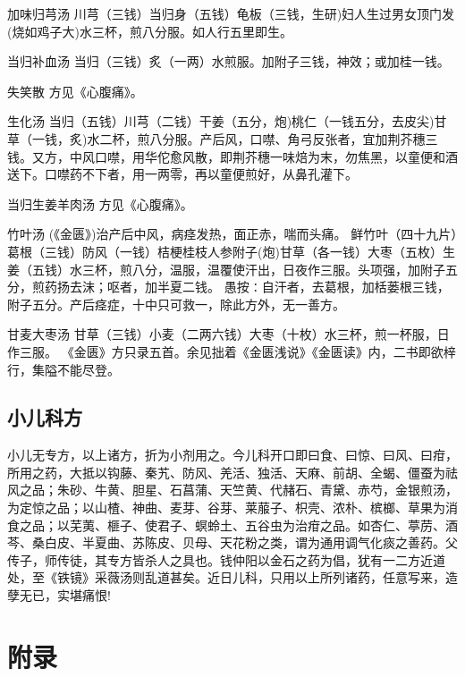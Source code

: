 \documentclass[a4paper,12pt,UTF8,twoside]{ctexbook}
\begin{document}
	加味归芎汤
	川芎（三钱）当归身（五钱）龟板（三钱，生研)妇人生过男女顶门发(烧如鸡子大)水三杯，煎八分服。如人行五里即生。
	
	当归补血汤
	当归（三钱）炙（一两）水煎服。加附子三钱，神效；或加桂一钱。
	
	失笑散
	方见《心腹痛》。
	
	生化汤
	当归（五钱）川芎（二钱）干姜（五分，炮)桃仁（一钱五分，去皮尖)甘草（一钱，炙)水二杯，煎八分服。产后风，口噤、角弓反张者，宜加荆芥穗三钱。又方，中风口噤，用华佗愈风散，即荆芥穗一味焙为末，勿焦黑，以童便和酒送下。口噤药不下者，用一两零，再以童便煎好，从鼻孔灌下。
	
	当归生姜羊肉汤
	方见《心腹痛》。
	
	竹叶汤
	(《金匮》)治产后中风，病痉发热，面正赤，喘而头痛。
	鲜竹叶（四十九片）葛根（三钱）防风（一钱）桔梗桂枝人参附子(炮)甘草（各一钱）大枣（五枚）生姜（五钱）水三杯，煎八分，温服，温覆使汗出，日夜作三服。头项强，加附子五分，煎药扬去沫；呕者，加半夏二钱。
	愚按∶自汗者，去葛根，加栝蒌根三钱，附子五分。产后痉症，十中只可救一，除此方外，无一善方。
	
	甘麦大枣汤
	甘草（三钱）小麦（二两六钱）大枣（十枚）水三杯，煎一杯服，日作三服。
	《金匮》方只录五首。余见拙着《金匮浅说》《金匮读》内，二书即欲梓行，集隘不能尽登。
	
	\chapter{小儿科方}
	    小儿无专方，以上诸方，折为小剂用之。今儿科开口即曰食、曰惊、曰风、曰疳，所用之药，大抵以钩藤、秦艽、防风、羌活、独活、天麻、前胡、全蝎、僵蚕为祛风之品；朱砂、牛黄、胆星、石菖蒲、天竺黄、代赭石、青黛、赤芍，金银煎汤，为定惊之品；以山楂、神曲、麦芽、谷芽、莱菔子、枳壳、浓朴、槟榔、草果为消食之品；以芜荑、榧子、使君子、螟蛉土、五谷虫为治疳之品。如杏仁、葶苈、酒芩、桑白皮、半夏曲、苏陈皮、贝母、天花粉之类，谓为通用调气化痰之善药。父传子，师传徒，其专方皆杀人之具也。钱仲阳以金石之药为倡，犹有一二方近道处，至《铁镜》采薇汤则乱道甚矣。近日儿科，只用以上所列诸药，任意写来，造孽无已，实堪痛恨!
	
	\part{附录}
\end{document}
